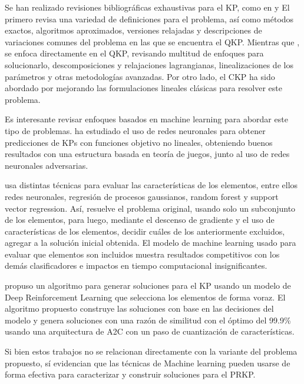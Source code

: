 \documentclass[spanish, a4paper, 12pt, twoside, openany,final]{book}
\numberwithin{equation}{section}                %
\begin{document}
Se han realizado revisiones bibliográficas exhaustivas para el KP, como en \cite{kellerer_knapsack_2004} y \cite{pisinger_quadratic_2007} El primero revisa una variedad de definiciones para el problema, así como métodos exactos, algoritmos aproximados, versiones relajadas y descripciones de variaciones comunes del problema en las que se encuentra el QKP. Mientras que \cite{pisinger_quadratic_2007}, se enfoca directamente en el QKP, revisando multitud de enfoques para solucionarlo, descomposiciones y relajaciones lagrangianas, linealizaciones de los parámetros y otras metodologías avanzadas.  Por otro lado, el CKP ha sido abordado por \cite{forrester_strengthening_2022} mejorando las formulaciones lineales clásicas para resolver este problema.

Es interesante revisar enfoques basados en machine learning para abordar este tipo de problemas. \cite{li_novel_2021} ha estudiado el uso de redes neuronales para obtener predicciones de KPs con funciones objetivo no lineales, obteniendo buenos resultados con una estructura basada en teoría de juegos, junto al uso de redes neuronales adversarias.

\cite{rezoug_application_2022} usa distintas técnicas para evaluar las características de los elementos, entre ellos redes neuronales, regresión de procesos gaussianos, random forest y support vector regression. Así, resuelve el problema original, usando solo un subconjunto de los elementos, para luego, mediante el descenso de gradiente y el uso de características de los elementos, decidir cuáles de los anteriormente excluidos, agregar a la solución inicial obtenida. El modelo de machine learning usado para evaluar que elementos son incluidos muestra resultados competitivos con los demás clasificadores e impactos en tiempo computacional insignificantes.

\cite{afshar_state_2020} propuso un algoritmo para generar soluciones para el KP usando un modelo de Deep Reinforcement Learning que selecciona los elementos de forma voraz. El algoritmo propuesto construye las soluciones con base en las decisiones del modelo y genera soluciones con una razón de similitud con el óptimo del 99.9\% usando una arquitectura de A2C con un paso de cuantización de características.

Si bien estos trabajos no se relacionan directamente con la variante del problema propuesto, sí evidencian que las técnicas de Machine learning pueden usarse de forma efectiva para caracterizar y construir soluciones para el PRKP.
\end{document}
